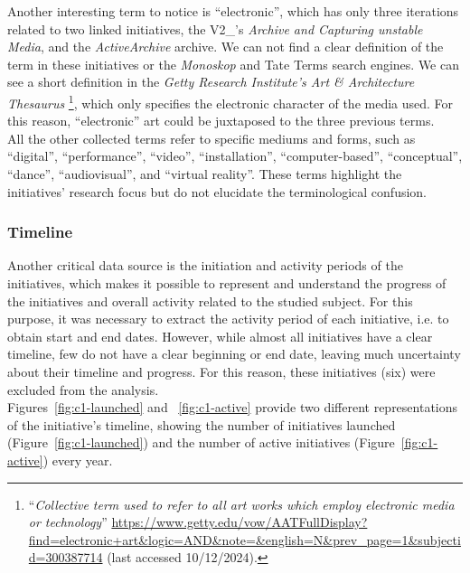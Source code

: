 Another interesting term to notice is ``electronic'', which has only three iterations related to two linked initiatives, the V2\_’s \textit{Archive and Capturing unstable Media}, and the \textit{ActiveArchive} archive. We can not find a clear definition of the term in these initiatives or the \textit{Monoskop} and Tate Terms search engines. We can see a short definition in the \textit{Getty Research Institute's Art \& Architecture Thesaurus} \footnote{``\textit{Collective term used to refer to all art works which employ electronic media or technology}” \url{https://www.getty.edu/vow/AATFullDisplay?find=electronic+art&logic=AND&note=&english=N&prev_page=1&subjectid=300387714} (last accessed 10/12/2024).}, which only specifies the electronic character of the media used. For this reason, ``electronic'' art could be juxtaposed to the three previous terms.\\
All the other collected terms refer to specific mediums and forms, such as ``digital'', ``performance'', ``video'', ``installation'', ``computer-based'', ``conceptual'', ``dance'', ``audiovisual'', and ``virtual reality''. These terms highlight the initiatives' research focus but do not elucidate the terminological confusion.

\subsubsection{Timeline}
Another critical data source is the initiation and activity periods of the initiatives, which makes it possible to represent and understand the progress of the initiatives and overall activity related to the studied subject. For this purpose, it was necessary to extract the activity period of each initiative, i.e. to obtain start and end dates. However, while almost all initiatives have a clear timeline, few do not have a clear beginning or end date, leaving much uncertainty about their timeline and progress. For this reason, these initiatives (six) were excluded from the analysis.\\
Figures~\ref{fig:c1-launched} and ~\ref{fig:c1-active} provide two different representations of the initiative's timeline, showing the number of initiatives launched (Figure~\ref{fig:c1-launched}) and the number of active initiatives (Figure~\ref{fig:c1-active}) every year. 


